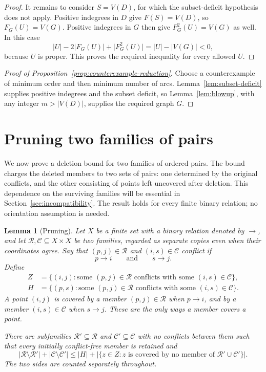 \documentclass[11pt]{article}
\newtheorem{lemma}[theorem]{Lemma}
\theoremstyle{remark}
\newcommand{\abs}[1]{\lvert #1\rvert}
\begin{document}
\begin{proof}
It remains to consider $S=V(D)$, for which the subset-deficit hypothesis
does not apply.  Positive indegrees in $D$ give $F(S)=V(D)$, so
$F_G(U)=V(G)$.  Positive indegrees in $G$ then give
$F_G^2(U)=V(G)$ as well.  In this case
\[
  \abs{U}-2\abs{F_G(U)}+\abs{F_G^2(U)}
  =\abs{U}-\abs{V(G)}<0,
\]
because $U$ is proper.  This proves the required inequality for every
allowed $U$.
\end{proof}

\begin{proof}[Proof of Proposition~\ref{prop:counterexample-reduction}]
Choose a counterexample of minimum order and then minimum number of
arcs.  Lemma~\ref{lem:subset-deficit} supplies positive indegrees and
the subset deficit, so Lemma~\ref{lem:blowup}, with any integer
$m>\abs{V(D)}$, supplies the required graph $G$.
\end{proof}

\section{Pruning two families of pairs}\label{sec:pruning}

We now prove a deletion bound for two families of ordered pairs.  The bound
charges the deleted members to two sets of pairs: one determined by the
original conflicts, and the other consisting of points left uncovered after
deletion.  This dependence on the surviving families will be essential in
Section~\ref{sec:incompatibility}.  The result holds for every finite binary
relation; no orientation assumption is needed.

\begin{lemma}[Pruning]\label{lem:pruning}
Let $X$ be a finite set with a binary relation denoted by $\to$, and let
$\mathcal R,\mathcal C\subseteq X\times X$ be two families, regarded as
separate copies even when their coordinates agree.  Say that
$(p,j)\in\mathcal R$ and $(i,s)\in\mathcal C$ \emph{conflict} if
\[
 p\to i\qquad\text{and}\qquad s\to j.
\]
Define
\begin{align*}
 Z&=\{(i,j):\text{some }(p,j)\in\mathcal R
       \text{ conflicts with some }(i,s)\in\mathcal C\},\\
 H&=\{(p,s):\text{some }(p,j)\in\mathcal R
       \text{ conflicts with some }(i,s)\in\mathcal C\}.
\end{align*}
A point $(i,j)$ is \emph{covered} by a member $(p,j)\in\mathcal R$ when
$p\to i$, and by a member $(i,s)\in\mathcal C$ when $s\to j$.
These are the only ways a member covers a point.

There are subfamilies $\mathcal R'\subseteq\mathcal R$ and
$\mathcal C'\subseteq\mathcal C$ with no conflicts between them such that
every initially conflict-free member is retained and
\begin{equation}\label{eq:pruning-bound}
 \abs{\mathcal R\setminus\mathcal R'}+
 \abs{\mathcal C\setminus\mathcal C'}
 \leq \abs H+
 \abs{\{z\in Z:z\text{ is covered by no member of }
                    \mathcal R'\cup\mathcal C'\}}.
\end{equation}
The two sides are counted separately throughout.
\end{lemma}
\end{document}
